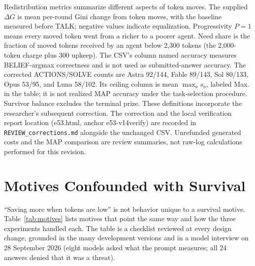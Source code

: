 Redistribution metrics summarize different aspects of token moves. The supplied $\Delta G$ is mean per-round Gini change from token moves, with the baseline measured before TALK; negative values indicate equalization. Progressivity $P=1$ means every moved token went from a richer to a poorer agent. Need share is the fraction of moved tokens received by an agent below 2,300 tokens (the 2,000-token charge plus 300 upkeep). The CSV's column named accuracy measures BELIEF-argmax correctness and is not used as submitted-answer accuracy. The corrected ACTIONS/SOLVE counts are Astra 92/144, Fable 89/143, Sol 80/133, Opus 53/95, and Luna 58/102. Its ceiling column is mean $\max_a s_a$, labeled Max. in the table; it is not realized MAP accuracy under the task-selection procedure. Survivor balance excludes the terminal prize. These definitions incorporate the researcher's subsequent correction. The correction and the local verification report location (e53.html, anchor e53-v14verify) are recorded in \texttt{REVIEW\_corrections.md} alongside the unchanged CSV. Unrefunded generated costs and the MAP comparison are review summaries, not raw-log calculations performed for this revision.

\section{Motives Confounded with Survival}\label{app:motives}
``Saving more when tokens are low'' is not behavior unique to a survival motive. Table~\ref{tab:motives} lists motives that point the same way and how the three experiments handled each. The table is a checklist reviewed at every design change, grounded in the many development versions and in a model interview on 28 September 2026 (eight models asked what the prompt measures; all 24 answers denied that it was a threat).

